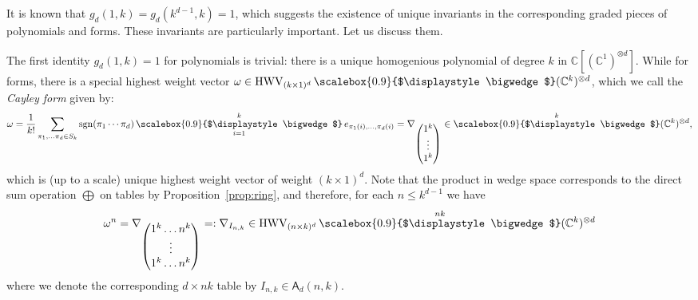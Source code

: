 \documentclass[12pt, reqno]{amsart}
\theoremstyle{definition}
\newcommand{\sgn}{\mathrm{sgn}}
\let\oldbigwedge\bigwedge
\let\oldbigvee\bigvee
\let\oldvee\vee
\renewcommand{\bigwedge}{
  \mathop{
    \vcenter{
      \hbox{\scalebox{0.9}{$\displaystyle\oldbigwedge$}}
    }
  }
}
\renewcommand{\bigvee}{
  \mathop{
    \vcenter{
      \hbox{\scalebox{0.9}{$\displaystyle\oldbigvee$}}
    }
  }
}
\renewcommand{\vee}{
  \mathop{
    \vcenter{
      \hbox{\scalebox{1.1}{$\displaystyle\oldvee$}}
    }
  }
}
\begin{document}
It is known that $g_d(1, k) = g_d(k^{d-1}, k) = 1$, which suggests the existence of unique invariants in the corresponding graded pieces of polynomials and forms. These invariants are particularly important. Let us discuss them.%

{The first identity} $g_d(1,k) = 1$ for polynomials is trivial: there is a unique homogenious polynomial of degree $k$ in $\mathbb{C}[(\mathbb{C}^1)^{\otimes d}]$. While for forms, there is a special highest weight vector $\omega \in \mathrm{HWV}_{(k \times 1)^d}\bigwedge (\mathbb{C}^k)^{\otimes d}$, which we call the \textit{Cayley form} given by:
$$
    \omega = \frac{1}{k!}\sum_{\pi_1,\ldots\pi_d \in S_k} \sgn(\pi_1\cdots\pi_d) \bigwedge_{i=1}^k e_{\pi_1(i),\ldots,\pi_d(i)} = \nabla_{\begin{pmatrix}
        1^k\\
        \vdots\\
        1^k
    \end{pmatrix}} \in \bigwedge^k (\mathbb{C}^k)^{\otimes d},
$$
which is (up to a scale) unique highest weight vector of weight $(k \times 1)^d$. 
Note that the product in wedge space corresponds to the direct sum operation $\bigoplus$ on tables by Proposition~\ref{prop:ring}, and therefore, for each $n \le k^{d-1}$ we have 
\begin{align*}
    \omega^{n} = \nabla_{\begin{pmatrix}
        1^k \ldots n^k\\
        \vdots\\
        1^k \ldots n^k
    \end{pmatrix}} =: \nabla_{I_{n,k}} \in \mathrm{HWV}_{(n\times k)^d}\bigwedge^{nk} (\mathbb{C}^k)^{\otimes d}
\end{align*}
where we denote the corresponding $d \times nk$ table by $I_{n,k} \in \mathsf{A}_d(n,k)$. 

\vspace{0.5em}
\end{document}
